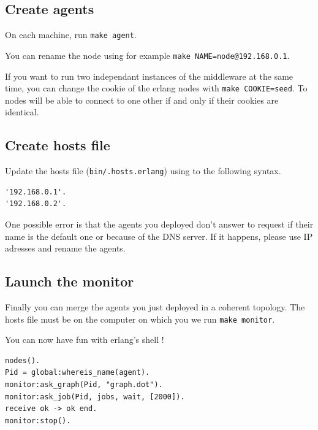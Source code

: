 \documentclass[a4paper, 11pt]{article}
\begin{document}
\subsection{Create agents}

On each machine, run \verb|make agent|.

\medskip\noindent You can rename the node using for example \verb|make NAME=node@192.168.0.1|.

\medskip\noindent If you want to run two independant instances of the middleware at the same time, you can change the cookie of the erlang nodes with \verb|make COOKIE=seed|. To nodes will be able to connect to one other if and only if their cookies are identical.

\subsection{Create hosts file}

Update the hosts file (\verb|bin/.hosts.erlang|) using to the following syntax.
\begin{verbatim}
'192.168.0.1'.
'192.168.0.2'.
\end{verbatim}

One possible error is that the agents you deployed don't answer to request if their name is the default one or because of the DNS server. If it happens, please use IP adresses and rename the agents.

\subsection{Launch the monitor}

Finally you can merge the agents you just deployed in a coherent topology. The hosts file must be on the computer on which you we run \verb|make monitor|.

\medskip\noindent You can now have fun with erlang's shell !
\begin{verbatim}
nodes().
Pid = global:whereis_name(agent).
monitor:ask_graph(Pid, "graph.dot").
monitor:ask_job(Pid, jobs, wait, [2000]).
receive ok -> ok end.
monitor:stop().
\end{verbatim}
\end{document}
